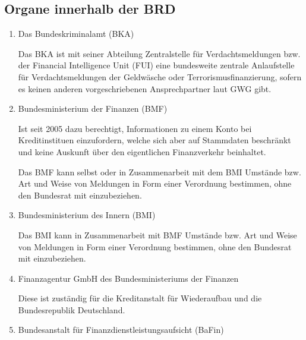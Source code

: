 \documentclass{article}
\begin{document}
        \subsection[Organe BRD]{Organe innerhalb der BRD}

            \begin{enumerate}

                \item Das Bundeskriminalamt (BKA)

                    Das BKA ist mit seiner Abteilung Zentralstelle für Verdachtsmeldungen bzw. der Financial Intelligence Unit (FUI) eine bundesweite zentrale Anlaufstelle für Verdachtsmeldungen der Geldwäsche oder Terrorismusfinanzierung, sofern es keinen anderen vorgeschriebenen Ansprechpartner laut GWG gibt.

                \item Bundesministerium der Finanzen (BMF)

                    Ist seit 2005 dazu berechtigt, Informationen zu einem Konto bei Kreditinstituen einzufordern, welche sich aber auf Stammdaten beschränkt und keine Auskunft über den eigentlichen Finanzverkehr beinhaltet. \cite{Tätigkeitsbericht}

                    Das BMF kann selbst oder in Zusammenarbeit mit dem BMI Umstände bzw. Art und Weise von Meldungen in Form einer Verordnung bestimmen, ohne den Bundesrat mit einzubeziehen.

                \item Bundesministerium des Innern (BMI)

                    Das BMI kann in Zusammenarbeit mit BMF Umstände bzw. Art und Weise von Meldungen in Form einer Verordnung bestimmen, ohne den Bundesrat mit einzubeziehen.                

                \item Finanzagentur GmbH des Bundesministeriums der Finanzen

                    Diese ist zuständig für die Kreditanstalt für Wiederaufbau und die Bundesrepublik Deutschland.

                \item Bundesanstalt für Finanzdienstleistungsaufsicht (BaFin)


\end{enumerate}
\end{document}

